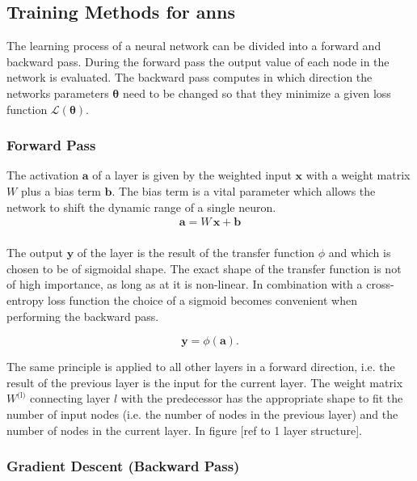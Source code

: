 \subsection{Training Methods for \glspl{ann}}
\label{trainingANN}

The learning process of a neural network can be divided into a forward and backward pass. During the forward pass the output value of each node in the network is evaluated. The backward pass computes in which direction the networks parameters $\mathbf{\theta}$ need to be changed so that they minimize a given loss function $\mathcal{L}(\mathbf{\theta})$.

\subsubsection{Forward Pass}
The activation $\mathbf{a}$ of a layer is given by the weighted input $\mathbf{x}$ with a weight matrix $W$ plus a bias term $\mathbf{b}$. The bias term is a vital parameter which allows the network to shift the dynamic range of a single neuron. 
\begin{align}
\label{activation}
\mathbf{a} = W \, \mathbf{x} + \mathbf{b} \\
\end{align}

The output $\mathbf{y}$ of the layer is the result of the transfer function $\phi$ and which is chosen to be of sigmoidal shape. The exact shape of the transfer function is not of high importance, as long as at it is non-linear. In combination with a cross-entropy loss function the choice of a sigmoid becomes convenient when performing the backward pass.

\begin{equation}
\mathbf{y} = \phi(\mathbf{a}).
\end{equation}

The same principle is applied to all other layers in a forward direction, i.e. the result of the previous layer is the input for the current layer. The weight matrix $W^{\text{(l)}}$ connecting layer $l$ with the predecessor has the appropriate shape to fit the number of input nodes (i.e. the number of nodes in the previous layer) and the number of nodes in the current layer. In figure [ref to 1 layer structure].

\subsubsection{Gradient Descent (Backward Pass)}

